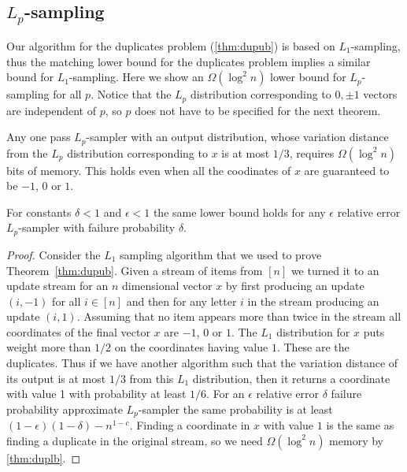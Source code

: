 \subsection{$L_p$-sampling}
Our algorithm for the duplicates problem (\autoref{thm:dupub}) is based on
$L_1$-sampling, thus the matching lower bound for the duplicates problem
implies a similar bound for $L_1$-sampling. Here we show an $\Omega(\log^2 n)$ lower bound for $L_p$-sampling for all $p$.
 Notice that the $L_p$ distribution corresponding to $0,\pm1$
vectors are independent of $p$, so $p$ does not have to be specified for the
next theorem.

\begin{theorem}\label{lpl}
Any one pass
$L_p$-sampler with an output distribution,
whose variation distance from the $L_p$ distribution corresponding to $x$ is
at most $1/3$, requires $\Omega(\log^2n)$ bits of memory. This holds even
when all the coodinates of $x$
are
guaranteed to be $-1$, $0$ or $1$.

For constants $\delta<1$ and $\epsilon<1$ the same lower bound holds for any
$\epsilon$ relative error $L_p$-sampler with failure probability $\delta$.
\end{theorem}

\begin{proof}
Consider the $L_1$ sampling algorithm that we used to prove
Theorem~\ref{thm:dupub}. Given a stream of items from $[n]$ we turned it to
an update stream for an $n$ dimensional vector $x$ by first
producing an update $(i,-1)$ for all $i\in[n]$ and then for any letter $i$ in
the stream producing an update $(i,1)$. Assuming that no item appears more
than twice in the stream all coordinates of the final vector $x$ are $-1$, $0$
or $1$. The $L_1$ distribution for $x$ puts weight more than $1/2$ on the
coordinates having value $1$. These are the duplicates. Thus if we have
another algorithm such that the variation distance of its output is at most
$1/3$ from this $L_1$ distribution, then it returns a coordinate with value 1
with probability at least $1/6$. For an $\epsilon$ relative error $\delta$
failure probability approximate $L_p$-sampler the same probability is at least
$(1-\epsilon)(1-\delta)-n^{1-c}$. Finding a coordinate in $x$ with value $1$
is the same as finding a duplicate in the original stream, so we need
$\Omega(\log^2n)$ memory by \autoref{thm:duplb}.
\end{proof}



